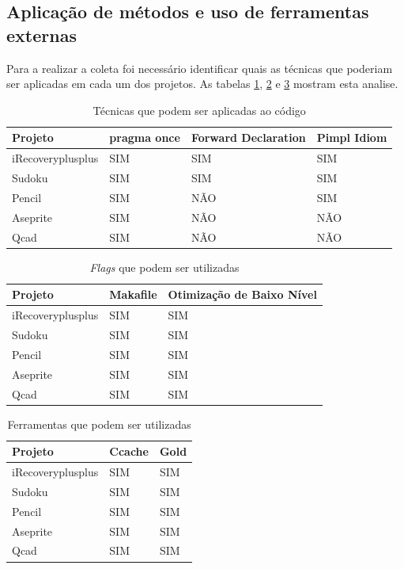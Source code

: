\subsection{Aplicação de métodos e uso de ferramentas externas}

	Para a realizar a coleta foi necessário identificar quais
 as técnicas que poderiam ser aplicadas em cada um dos projetos.
 As tabelas \ref{tecnicas_que_podem_ser_aplicadas_codigo},
 \ref{tecnicas_que_podem_ser_aplicadas_flag} 
e \ref{tecnicas_que_podem_ser_aplicadas_ferramenta} mostram esta analise.

\begin{table}[h]
\centering
\caption{Técnicas que podem ser aplicadas ao código}
\label{tecnicas_que_podem_ser_aplicadas_codigo}
\begin{tabular}{llll}
\textbf{Projeto} & \textbf{pragma once} & \textbf{Forward Declaration} & \textbf{Pimpl Idiom}  \\ \toprule 
iRecoveryplusplus & SIM & SIM & SIM  \\ 
Sudoku &  SIM & SIM & SIM  \\ 
Pencil & SIM & NÃO &  SIM \\ 
Aseprite &  SIM & NÃO & NÃO  \\ 
Qcad &  SIM & NÃO & NÃO  \\ \bottomrule
\end{tabular} 
\end{table}

\begin{table}[h]
\centering
\caption{\textit{Flags} que podem ser utilizadas}
\label{tecnicas_que_podem_ser_aplicadas_flag}
\begin{tabular}{lll}
\textbf{Projeto} & \textbf{Makafile} &  \textbf{Otimização de Baixo Nível} \\ \toprule
iRecoveryplusplus & SIM & SIM\\ 
Sudoku &  SIM & SIM  \\ 
Pencil &  SIM & SIM  \\ 
Aseprite & SIM & SIM  \\ 
Qcad &   SIM & SIM\\ \bottomrule
\end{tabular} 
\end{table}

\begin{table}[h]
\centering
\caption{Ferramentas que podem ser utilizadas}
\label{tecnicas_que_podem_ser_aplicadas_ferramenta}
\begin{tabular}{lll}
\textbf{Projeto} &  \textbf{Ccache} & \textbf{Gold} \\ \toprule 
iRecoveryplusplus &  SIM & SIM \\ 
Sudoku            &  SIM & SIM \\ 
Pencil            &  SIM & SIM \\ 
Aseprite          &  SIM & SIM \\ 
Qcad              &  SIM & SIM \\ \bottomrule
\end{tabular} 
\end{table}


